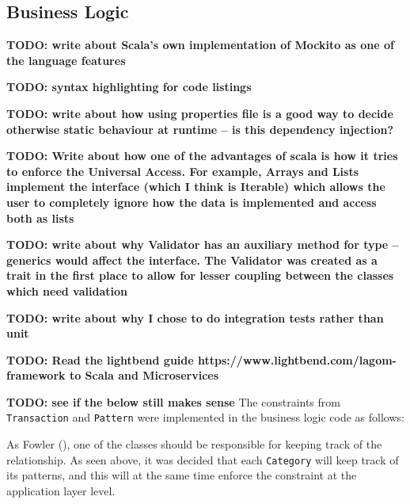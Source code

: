 \subsection{Business Logic} \label{sec:Implementation.BusinessLogic}

\textbf{TODO: write about Scala's own implementation of Mockito as one of the
language features}

\textbf{TODO: syntax highlighting for code listings}

\textbf{TODO: write about how using properties file is a good way to decide
otherwise static behaviour at runtime -- is this dependency injection?}

\textbf{TODO: Write about how one of the advantages of scala is how it tries to
enforce the Universal Access. For example, Arrays and Lists implement the
interface (which I think is Iterable) which allows the user to completely
ignore how the data is implemented and access both as lists}

\textbf{TODO: write about why Validator has an auxiliary method for type --
generics would affect the interface. The Validator was created as a trait in
the first place to allow for lesser coupling between the classes which need
validation}

\textbf{TODO: write about why I chose to do integration tests rather than unit}

\textbf{TODO: Read the lightbend guide
https://www.lightbend.com/lagom-framework to Scala and Microservices}

\textbf{TODO: see if the below still makes sense}
The constraints from \texttt{Transaction} and \texttt{Pattern} were implemented
in the business logic code as follows:
{
  \small
  
}

{
  \small
  
}

As Fowler (\citeyear[][]{fowler1997analysis}), one of the classes should be
responsible for keeping track of the relationship. As seen above, it was
decided that each \texttt{Category} will keep track of its patterns, and this
will at the same time enforce the constraint at the application layer level.



